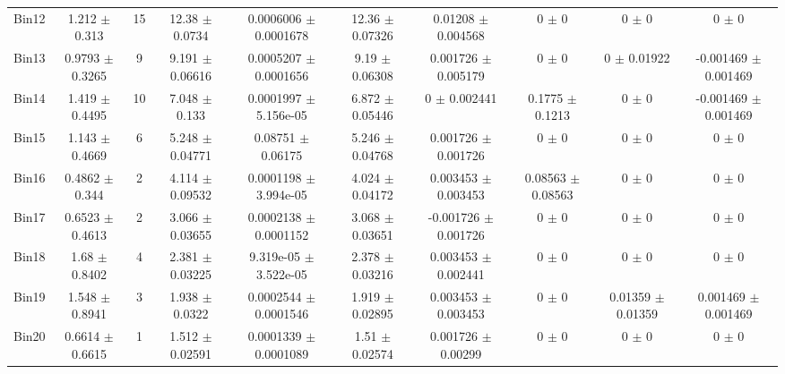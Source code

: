 \begin{tabular}{@{\extracolsep{4pt}}lccccccccc@{}}
     Bin12 & 1.212 $\pm$ 0.313 & 15 & 12.38 $\pm$ 0.0734 & 0.0006006 $\pm$ 0.0001678 & 12.36 $\pm$ 0.07326 & 0.01208 $\pm$ 0.004568 & 0 $\pm$ 0 & 0 $\pm$ 0 & 0 $\pm$ 0 \\ 
     Bin13 & 0.9793 $\pm$ 0.3265 & 9 & 9.191 $\pm$ 0.06616 & 0.0005207 $\pm$ 0.0001656 & 9.19 $\pm$ 0.06308 & 0.001726 $\pm$ 0.005179 & 0 $\pm$ 0 & 0 $\pm$ 0.01922 & -0.001469 $\pm$ 0.001469 \\ 
     Bin14 & 1.419 $\pm$ 0.4495 & 10 & 7.048 $\pm$ 0.133 & 0.0001997 $\pm$ 5.156e-05 & 6.872 $\pm$ 0.05446 & 0 $\pm$ 0.002441 & 0.1775 $\pm$ 0.1213 & 0 $\pm$ 0 & -0.001469 $\pm$ 0.001469 \\ 
     Bin15 & 1.143 $\pm$ 0.4669 & 6 & 5.248 $\pm$ 0.04771 & 0.08751 $\pm$ 0.06175 & 5.246 $\pm$ 0.04768 & 0.001726 $\pm$ 0.001726 & 0 $\pm$ 0 & 0 $\pm$ 0 & 0 $\pm$ 0 \\ 
     Bin16 & 0.4862 $\pm$ 0.344 & 2 & 4.114 $\pm$ 0.09532 & 0.0001198 $\pm$ 3.994e-05 & 4.024 $\pm$ 0.04172 & 0.003453 $\pm$ 0.003453 & 0.08563 $\pm$ 0.08563 & 0 $\pm$ 0 & 0 $\pm$ 0 \\ 
     Bin17 & 0.6523 $\pm$ 0.4613 & 2 & 3.066 $\pm$ 0.03655 & 0.0002138 $\pm$ 0.0001152 & 3.068 $\pm$ 0.03651 & -0.001726 $\pm$ 0.001726 & 0 $\pm$ 0 & 0 $\pm$ 0 & 0 $\pm$ 0 \\ 
     Bin18 & 1.68 $\pm$ 0.8402 & 4 & 2.381 $\pm$ 0.03225 & 9.319e-05 $\pm$ 3.522e-05 & 2.378 $\pm$ 0.03216 & 0.003453 $\pm$ 0.002441 & 0 $\pm$ 0 & 0 $\pm$ 0 & 0 $\pm$ 0 \\ 
     Bin19 & 1.548 $\pm$ 0.8941 & 3 & 1.938 $\pm$ 0.0322 & 0.0002544 $\pm$ 0.0001546 & 1.919 $\pm$ 0.02895 & 0.003453 $\pm$ 0.003453 & 0 $\pm$ 0 & 0.01359 $\pm$ 0.01359 & 0.001469 $\pm$ 0.001469 \\ 
     Bin20 & 0.6614 $\pm$ 0.6615 & 1 & 1.512 $\pm$ 0.02591 & 0.0001339 $\pm$ 0.0001089 & 1.51 $\pm$ 0.02574 & 0.001726 $\pm$ 0.00299 & 0 $\pm$ 0 & 0 $\pm$ 0 & 0 $\pm$ 0 \\ 
\hline\hline
  \end{tabular}
